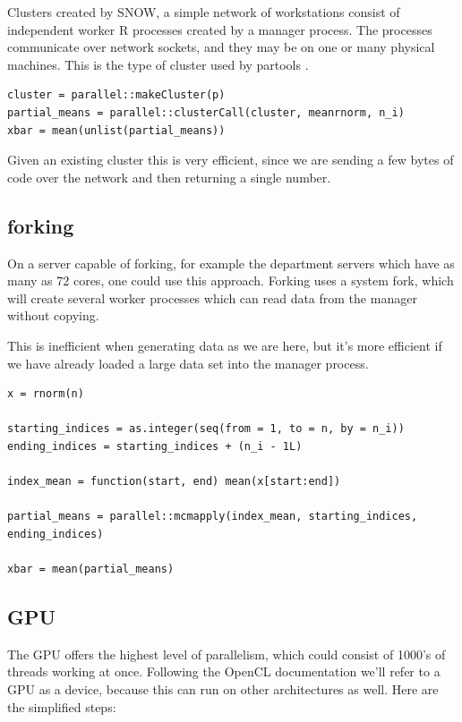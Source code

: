 \documentclass[12pt]{article}
\begin{document}
Clusters created by SNOW, a simple network of workstations consist of independent
worker R processes created by a manager process. The processes communicate
over network sockets, and they may be on one or many physical machines.
This is the type of cluster used by partools \cite{R-partools}.

\begin{verbatim}
cluster = parallel::makeCluster(p)
partial_means = parallel::clusterCall(cluster, meanrnorm, n_i)
xbar = mean(unlist(partial_means))
\end{verbatim}

Given an existing cluster this is very efficient, since we are sending a
few bytes of code over the network and then returning a single number.

\subsection{forking}

On a server capable of forking, for example the department servers which
have as many as 72 cores, one could use this approach. Forking uses a
system fork, which will create several worker processes which can read data from
the manager without copying.

This is inefficient when generating data as we are here, but it's more
efficient if we have already loaded a large data set into the manager
process.

\begin{verbatim}
x = rnorm(n)

starting_indices = as.integer(seq(from = 1, to = n, by = n_i))
ending_indices = starting_indices + (n_i - 1L)

index_mean = function(start, end) mean(x[start:end])

partial_means = parallel::mcmapply(index_mean, starting_indices, ending_indices)

xbar = mean(partial_means)
\end{verbatim}

\subsection{GPU}

The GPU offers the highest level of parallelism, which could consist of
1000's of threads working at once. Following the OpenCL documentation we'll
refer to a GPU as a device, because this can run on other architectures as
well. Here are the simplified steps:
\end{document}
